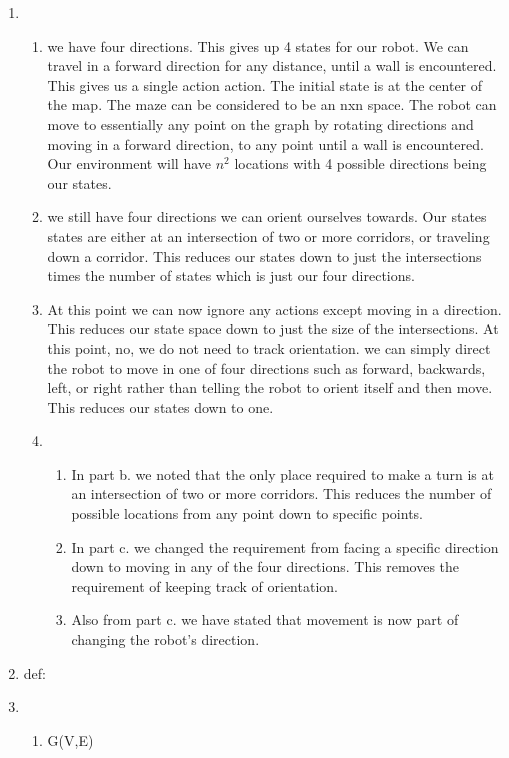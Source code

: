 \documentclass{article}
\begin{document}
\begin{enumerate}
\item \begin{enumerate}
	\item we have four directions. This gives up 4 states for our robot. We can travel in a forward direction for any distance, until a wall is encountered. This gives us a single action action.  The initial state is at the center of the map.  The maze can be considered to be an nxn space.  The robot can move to essentially any point on the graph by rotating directions and moving in a forward direction, to any point until a wall is encountered.  Our environment will have $n^2$ locations with 4 possible directions being our states.
	\item we still have four directions we can orient ourselves towards. Our states states are either at an intersection of two or more corridors, or traveling down a corridor. This reduces our states down to just the intersections times the number of states which is just our four directions.
	\item At this point we can now ignore any actions except moving in a direction.  This reduces our state space down to just the size of the intersections.  At this point, no, we do not need to track orientation. we can simply direct the robot to move in one of four directions such as forward, backwards, left, or right rather than telling the robot to orient itself and then move. This reduces our states down to one.
	\item \begin{enumerate}
		\item In part b. we noted that the only place required to make a turn is at an intersection of two or more corridors.  This reduces the number of possible locations from any point down to specific points.
		\item In part c. we changed the requirement from facing a specific direction down to moving in any of the four directions. This removes the requirement of keeping track of orientation.
		\item Also from part c. we have stated that movement is now part of changing the robot's direction.
		\end{enumerate}
	\end{enumerate}
\item def:
\item \begin{enumerate}
	\item G(V,E) \newline

\end{enumerate}
\end{enumerate}
\end{document}
